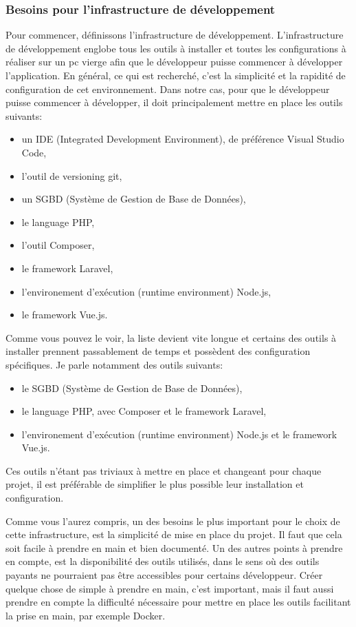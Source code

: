 \documentclass[
    iai, %
    il, %
]{heig-tb}
\begin{document}
\subsubsection{Besoins pour l'infrastructure de développement}
Pour commencer, définissons l'infrastructure de développement.\newline
L'infrastructure de développement englobe tous les outils à installer et toutes les configurations à réaliser sur un pc vierge afin que le développeur puisse commencer à développer l'application.
En général, ce qui est recherché, c'est la simplicité et la rapidité de configuration de cet environnement.\newline
Dans notre cas, pour que le développeur puisse commencer à développer, il doit principalement mettre en place les outils suivants:
\begin{itemize}
    \item un IDE (Integrated Development Environment), de préférence Visual Studio Code,
    \item l'outil de versioning git,
    \item un SGBD (Système de Gestion de Base de Données), %
    \item le language PHP,
    \item l'outil Composer,
    \item le framework Laravel,
    \item l'environement d'exécution (runtime environment) Node.js,
    \item le framework Vue.js.
\end{itemize}
Comme vous pouvez le voir, la liste devient vite longue et certains des outils à installer prennent passablement de temps et possèdent des configuration spécifiques.\newline
Je parle notamment des outils suivants:
\begin{itemize}
    \item le SGBD (Système de Gestion de Base de Données),
    \item le language PHP, avec Composer et le framework Laravel,
    \item l'environement d'exécution (runtime environment) Node.js et le framework Vue.js.
\end{itemize}
Ces outils n'étant pas triviaux à mettre en place et changeant pour chaque projet, il est préférable de simplifier le plus possible leur installation et configuration.

Comme vous l'aurez compris, un des besoins le plus important pour le choix de cette infrastructure, est la simplicité de mise en place du projet.\newline
Il faut que cela soit facile à prendre en main et bien documenté.\newline
Un des autres points à prendre en compte, est la disponibilité des outils utilisés, dans le sens où des outils payants ne pourraient pas être accessibles pour certains développeur.\newline
Créer quelque chose de simple à prendre en main, c'est important, mais il faut aussi prendre en compte la difficulté nécessaire pour mettre en place les outils facilitant la prise en main, par exemple Docker.
\end{document}
